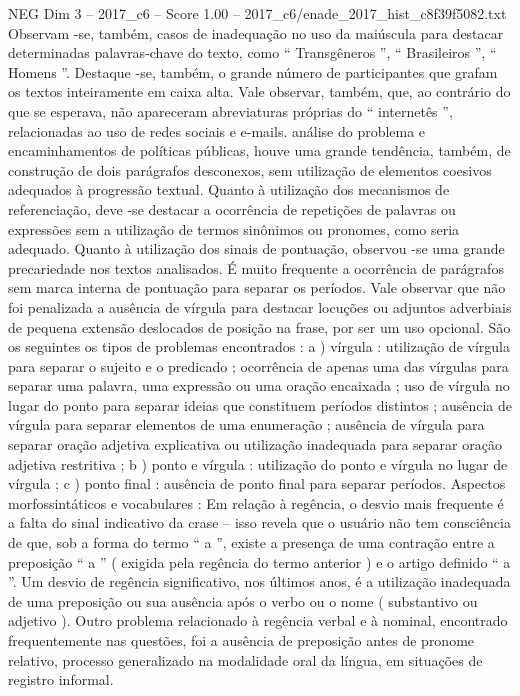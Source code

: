 \begin{textsample}{NEG Dim 3 – 2017\_c6 – Score 1.00 – 2017\_c6/enade\_2017\_hist\_c8f39f5082.txt}
Observam -se, também, casos de inadequação no uso da maiúscula para destacar determinadas palavras-chave do texto, como “ Transgêneros ”, “ Brasileiros ”, “ Homens ”.
Destaque -se, também, o grande número de participantes que grafam os textos inteiramente em caixa alta.
Vale observar, também, que, ao contrário do que se esperava, não apareceram abreviaturas próprias do “ internetês ”, relacionadas ao uso de redes sociais e e-mails. análise do problema e encaminhamentos de políticas públicas, houve uma grande tendência, também, de construção de dois parágrafos desconexos, sem utilização de elementos coesivos adequados à progressão textual.
Quanto à utilização dos mecanismos de referenciação, deve -se destacar a ocorrência de repetições de palavras ou expressões sem a utilização de termos sinônimos ou pronomes, como seria adequado.
Quanto à utilização dos sinais de pontuação, observou -se uma grande precariedade nos textos analisados.
É muito frequente a ocorrência de parágrafos sem marca interna de pontuação para separar os períodos.
Vale observar que não foi penalizada a ausência de vírgula para destacar locuções ou adjuntos adverbiais de pequena extensão deslocados de posição na frase, por ser um uso opcional.
São os seguintes os tipos de problemas encontrados : a ) vírgula : utilização de vírgula para separar o sujeito e o predicado ; ocorrência de apenas uma das vírgulas para separar uma palavra, uma expressão ou uma oração encaixada ; uso de vírgula no lugar do ponto para separar ideias que constituem períodos distintos ; ausência de vírgula para separar elementos de uma enumeração ; ausência de vírgula para separar oração adjetiva explicativa ou utilização inadequada para separar oração adjetiva restritiva ; b ) ponto e vírgula : utilização do ponto e vírgula no lugar de vírgula ; c ) ponto final : ausência de ponto final para separar períodos.
Aspectos morfossintáticos e vocabulares : Em relação à regência, o desvio mais frequente é a falta do sinal indicativo da crase – isso revela que o usuário não tem consciência de que, sob a forma do termo “ a ”, existe a presença de uma contração entre a preposição “ a ” ( exigida pela regência do termo anterior ) e o artigo definido “ a ”.
Um desvio de regência significativo, nos últimos anos, é a utilização inadequada de uma preposição ou sua ausência após o verbo ou o nome ( substantivo ou adjetivo ).
Outro problema relacionado à regência verbal e à nominal, encontrado frequentemente nas questões, foi a ausência de preposição antes de pronome relativo, processo generalizado na modalidade oral da língua, em situações de registro informal.

\end{textsample}
